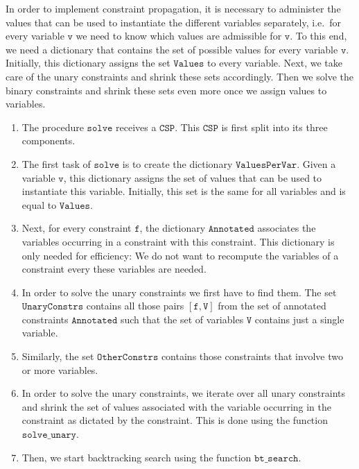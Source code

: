 In order to implement constraint propagation, it is necessary to administer the values that can be used
to instantiate the different variables separately, i.e.~for every variable $\texttt{v}$ we need to know which
values are admissible for $\texttt{v}$.  To this end, we need a dictionary that contains the set of possible
values for every variable $\texttt{v}$.  Initially, this dictionary assigns the set $\texttt{Values}$ to
every variable.  Next, we take care of the unary constraints and shrink these sets accordingly.  Then we solve
the binary constraints and shrink these sets even more once we assign values to variables.
\begin{enumerate}
\item The procedure $\texttt{solve}$ receives a $\texttt{CSP}$.  This $\texttt{CSP}$ is first split into its three components.
\item The first task of $\texttt{solve}$ is to create the dictionary $\texttt{ValuesPerVar}$.  
      Given a variable $\texttt{v}$, this dictionary assigns the set of values that can be used to instantiate this
      variable.  Initially, this set is the same for all variables and is equal to $\texttt{Values}$.
\item Next, for every constraint $\texttt{f}$, the dictionary $\texttt{Annotated}$ associates the
      variables occurring in a constraint with this constraint.  This dictionary is only needed for efficiency:
      We do not want to recompute the variables of a constraint every these variables are needed.
\item In order to solve the unary constraints we first have to find them.
      The set $\texttt{UnaryConstrs}$ contains all those pairs $[\texttt{f}, \texttt{V}]$ from the set of
      annotated constraints $\texttt{Annotated}$ such that the set of variables $\texttt{V}$ contains just a
      single variable. 
\item Similarly, the set $\texttt{OtherConstrs}$ contains those constraints that involve two or more variables.
\item In order to solve the unary constraints, we iterate over all unary constraints and shrink the set of
      values associated with the variable occurring in the constraint as dictated by the constraint.
      This is done using the function $\texttt{solve\_unary}$.
\item Then, we start backtracking search using the function $\texttt{bt\_search}$.  
\end{enumerate}

